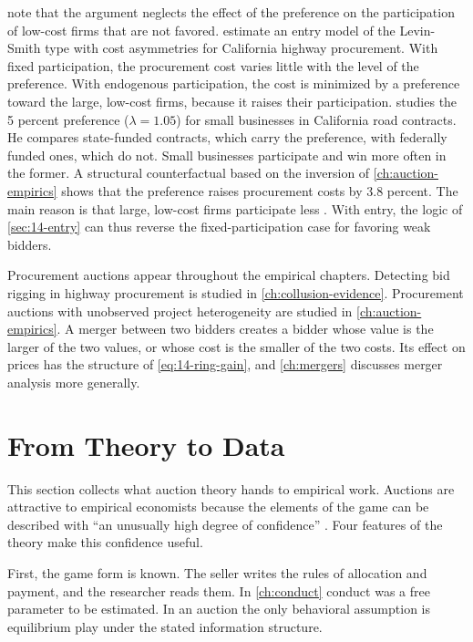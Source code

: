 \citet[p.~123]{HortacsuPerrigne2021} note that the argument neglects the effect of the preference on
the participation of low-cost firms that are not favored. \citet{KrasnokutskayaSeim2011} estimate an
entry model of the Levin-Smith type with cost asymmetries for California highway procurement. With
fixed participation, the procurement cost varies little with the level of the preference. With
endogenous participation, the cost is minimized by a preference toward the large, low-cost firms,
because it raises their participation. \citet{Marion2007} studies the 5 percent preference
($\lambda=1.05$) for small businesses in California road contracts. He compares state-funded
contracts, which carry the preference, with federally funded ones, which do not. Small businesses
participate and win more often in the former. A structural counterfactual based on the inversion of
\cref{ch:auction-empirics} shows that the preference raises procurement costs by 3.8 percent. The main
reason is that large, low-cost firms participate less \citep[Section~3.10, p.~122]{HortacsuPerrigne2021}.
With entry, the logic of \cref{sec:14-entry} can thus reverse the fixed-participation case for
favoring weak bidders.

Procurement auctions appear throughout the empirical chapters. Detecting bid rigging in highway
procurement \citep{PorterZona1993} is studied in \cref{ch:collusion-evidence}. Procurement auctions
with unobserved project heterogeneity \citep{Krasnokutskaya2011} are studied in
\cref{ch:auction-empirics}. A merger between two bidders creates a bidder whose value is the larger
of the two values, or whose cost is the smaller of the two costs. Its effect on prices has the
structure of \eqref{eq:14-ring-gain}, and \cref{ch:mergers} discusses merger analysis more generally.

\section{From Theory to Data}\label{sec:14-bridge}

This section collects what auction theory hands to empirical work. Auctions are attractive to
empirical economists because the elements of the game can be described with ``an unusually high
degree of confidence'' \citep[Section 1]{AtheyHaile2007}. Four features of the theory make this
confidence useful.

First, the game form is known. The seller writes the rules of allocation and payment, and the
researcher reads them. In \cref{ch:conduct} conduct was a free parameter to be estimated. In an
auction the only behavioral assumption is equilibrium play under the stated information structure.


